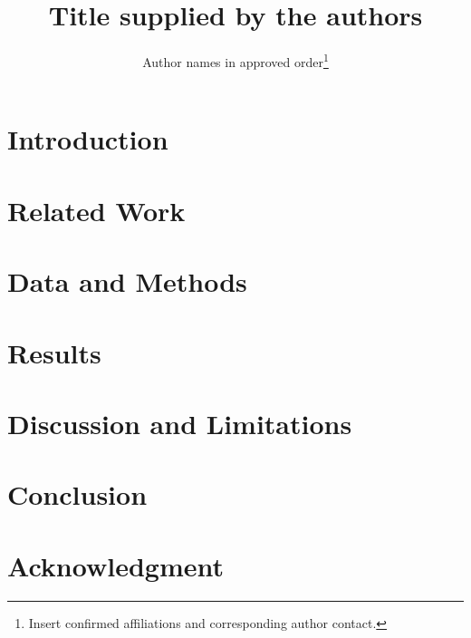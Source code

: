 \documentclass[10pt,journal,letterpaper]{IEEEtran}
\begin{document}
\title{Title supplied by the authors}
\author{Author names in approved order\thanks{Insert confirmed affiliations and corresponding author contact.}}
\maketitle
\begin{abstract}
\end{abstract}
\begin{IEEEkeywords}
\end{IEEEkeywords}
\section{Introduction}
\section{Related Work}
\section{Data and Methods}
\section{Results}
\section{Discussion and Limitations}
\section{Conclusion}
\section*{Acknowledgment}

\end{document}
